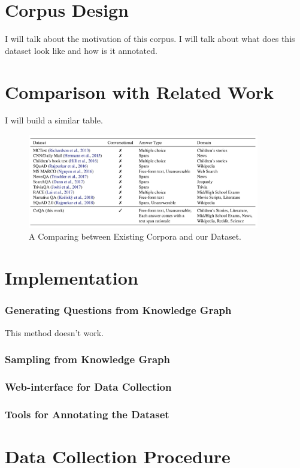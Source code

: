 \documentclass[bsc,frontabs,twoside,singlespacing,parskip,deptreport]{infthesis}     %
\begin{document}
\section{Corpus Design}
I will talk about the motivation of this corpus. I will talk about what does this dataset look like and how is it annotated.

\section{Comparison with Related Work}
I will build a similar table.
\begin{figure}[h]
    \centering
    \includegraphics[width=0.9\textwidth]{table.jpeg}
    \caption{A Comparing between Existing Corpora and our Dataset.}
    \label{fig:TABLE}
\end{figure}

\section{Implementation}
\subsubsection*{Generating Questions from Knowledge Graph}
This method doesn't work.
\subsubsection*{Sampling from Knowledge Graph}
\subsubsection*{Web-interface for Data Collection}
\subsubsection*{Tools for Annotating the Dataset}

\section{Data Collection Procedure}
\end{document}
